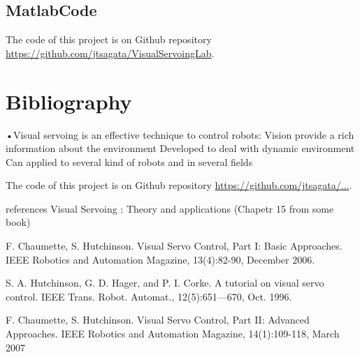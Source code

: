 \documentclass[a4paper,12pt]{article}
\begin{document}
\subsection{MatlabCode}
The code of this project is on Github repository \url{https://github.com/jtsagata/VisualServoingLab}.


\section{Bibliography}
•Visual servoing is an effective technique to control robots:
Vision provide a rich information about the environment
Developed to deal with dynamic environment
Can applied to several kind of robots and in several fields


The code of this project is on Github repository \url{https://github.com/jtsagata/...}.

references
Visual Servoing : Theory and applications (Chapetr 15 from some book)

F. Chaumette, S. Hutchinson. Visual Servo Control, Part I: Basic Approaches. IEEE Robotics and Automation Magazine, 13(4):82-90, December 2006.

S. A. Hutchinson, G. D. Hager, and P. I. Corke. A tutorial on visual servo control. IEEE Trans. Robot. Automat., 12(5):651—670, Oct. 1996.

F. Chaumette, S. Hutchinson. Visual Servo Control, Part II: Advanced Approaches. IEEE Robotics and Automation Magazine, 14(1):109-118, March 2007


\end{document}
